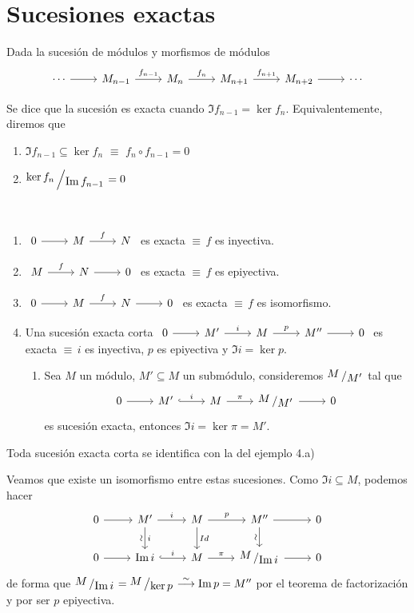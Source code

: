 \section{Sucesiones exactas}
Dada la sucesi\'on de m\'odulos y morfismos de m\'odulos 
$$\bt \cdots \arrow{r} & M_{n-1} \arrow{r}{f_{n-1}} & M_{n} \arrow{r}{f_{n}} & M_{n+1} \arrow{r}{f_{n+1}} & M_{n+2} \arrow{r} & \cdots \et$$
\begin{defi}
    Se dice que la sucesi\'on es exacta cuando $\Im f_{n-1} = \ker  f_n$. Equivalentemente, diremos que  \vspace{-3mm}
    \begin{enumerate} 
        \item $\Im f_{n-1} \subseteq \ker  f_n \, \, \equiv \, \,  f_n \circ f_{n-1} = 0 $
        \item $\modulo{\ker f_n}{\Im f_{n-1}} = 0$
    \end{enumerate}
\end{defi}
\begin{ejems} \,  \vspace{-3mm}
    \begin{enumerate}
        \item $\bt 0\arrow{r} & M \arrow{r}{f} & N \et$ es exacta $\equiv \, f$ es inyectiva.
        \item $\bt M \arrow{r}{f} & N \arrow{r}& 0   \et$ es exacta $\equiv \, f$ es epiyectiva.
        \item $\bt 0 \arrow{r}&  M \arrow{r}{f} & N \arrow{r}& 0   \et$ es exacta $\equiv \, f$ es isomorfismo.
        \item Una sucesi\'on exacta corta $\bt 0 \arrow{r} & M ' \arrow{r}{i}& M \arrow{r}{p} & M'' \arrow{r} & 0 \et$ es exacta $\equiv \, i$ es inyectiva, $p$ es epiyectiva y $\Im i = \ker  p$.
        \begin{enumerate}
            \item Sea $M$ un m\'odulo, $M'\subseteq M$ un subm\'odulo, consideremos $\modulo{M}{M'}$ tal que
            $$\bt 0 \arrow{r} &M' \arrow[hook]{r}{i} & M \arrow{r}{\pi} & \modulo{M}{M'} \arrow{r} & 0 \et$$ es sucesi\'on exacta, entonces $\Im i  = \ker  \pi = M'$. 
        \end{enumerate}
    \end{enumerate}
\end{ejems}
\begin{prop}
    Toda sucesi\'on exacta corta se identifica con la del ejemplo 4.a)
\end{prop}
\begin{dem}
    Veamos que existe un isomorfismo entre estas sucesiones. Como $\Im i \subseteq M$, podemos hacer
    $$\bt  0 \arrow{r} & M' \arrow[d, "i", "\rotatebox{270}{$\sim$}"'] \arrow{r}{i} & M\arrow{d}{Id} \arrow{r}{p} & M'' \arrow[d, "", "\rotatebox{270}{$\sim$}"']\arrow{r} & 0 \\
           0 \arrow{r} & \Im i \arrow[hook]{r}{i} & M \arrow{r}{\pi} & \modulo{M}{\Im i} \arrow{r} & 0
    \et$$
    de forma que $\modulo{M}{\Im i} = \modulo{M}{\ker p} \overset{\sim}{\longrightarrow} \Im p = M''$ por el teorema de factorizaci\'on y por ser $p$ epiyectiva.  
\end{dem}
